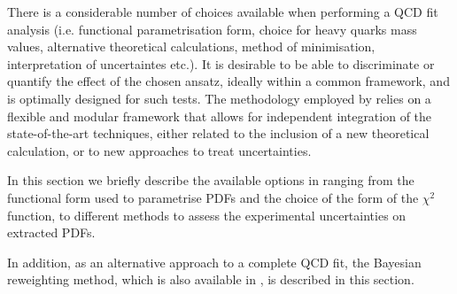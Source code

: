 


There is a considerable number of choices available when performing a QCD fit analysis 
(i.e. functional parametrisation form, choice for heavy quarks mass values, alternative theoretical calculations,
method of minimisation, interpretation of uncertaintes etc.).
%
 It is desirable to be able to discriminate or quantify the effect of the chosen ansatz, ideally within a common framework, and 
\fitter is optimally designed for such tests.
%
The methodology employed by \fitter  relies on a flexible and modular
framework that allows for independent integration of the state-of-the-art techniques, either related to the inclusion of a new theoretical calculation, or to new approaches to treat uncertainties. 
%

In this section we briefly describe the available options in \fitter ranging from the functional form used to parametrise PDFs and the choice of the form of the $\chi^2$ function, to different methods to assess the experimental uncertainties on extracted PDFs.

In addition, as an alternative approach to a complete QCD fit,  the Bayesian reweighting
method, which is also available in \fitter, is described in this section. 



